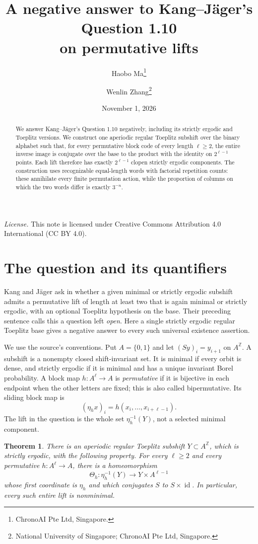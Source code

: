 \documentclass[11pt]{article}
\title{A negative answer to Kang--J\"ager's Question 1.10\protect\\ on permutative lifts}
\author{Haobo Ma\thanks{ChronoAI Pte Ltd, Singapore.}\and
Wenlin Zhang\thanks{National University of Singapore; ChronoAI Pte Ltd, Singapore.}}
\date{November 1, 2026}
\newtheorem{theorem}{Theorem}
\newcommand{\Z}{\mathbb Z}
\newcommand{\id}{\operatorname{id}}
\begin{document}
\maketitle
\begin{abstract}
We answer Kang--J\"ager's Question 1.10 \cite[Question 1.10]{KJ} negatively, including its strictly ergodic and Toeplitz versions.
We construct one aperiodic regular Toeplitz subshift over the binary alphabet such that, for every permutative block code of every length $\ell\geq2$, the entire inverse image is conjugate over the base to the product with the identity on $2^{\ell-1}$ points.
Each lift therefore has exactly $2^{\ell-1}$ clopen strictly ergodic components.
The construction uses recognizable equal-length words with factorial repetition counts: these annihilate every finite permutation action, while the proportion of columns on which the two words differ is exactly $3^{-n}$.
\end{abstract}
\noindent\textit{License.} This note is licensed under Creative Commons Attribution 4.0 International (CC BY 4.0).

\section{The question and its quantifiers}
Kang and J\"ager ask in \cite[Question 1.10]{KJ} whether a given minimal or strictly ergodic subshift admits a permutative lift of length at least two that is again minimal or strictly ergodic, with an optional Toeplitz hypothesis on the base. Their preceding sentence calls this a question left \emph{open}. Here a single strictly ergodic regular Toeplitz base gives a negative answer to every such universal existence assertion.

We use the source's conventions. Put $A=\{0,1\}$ and let $(Sy)_i=y_{i+1}$ on $A^{\Z}$. A subshift is a nonempty closed shift-invariant set. It is minimal if every orbit is dense, and strictly ergodic if it is minimal and has a unique invariant Borel probability. A block map $h:A^\ell\to A$ is \emph{permutative} if it is bijective in each endpoint when the other letters are fixed; this is also called bipermutative. Its sliding block map is
\[
 (\eta_hx)_i=h(x_i,\ldots,x_{i+\ell-1}).
\]
The lift in the question is the whole set $\eta_h^{-1}(Y)$, not a selected minimal component.

\begin{theorem}\label{thm:main}
There is an aperiodic regular Toeplitz subshift $Y\subset A^{\Z}$, which is strictly ergodic, with the following property. For every $\ell\geq2$ and every permutative $h:A^\ell\to A$, there is a homeomorphism
\[
 \Theta_h:\eta_h^{-1}(Y)\longrightarrow Y\times A^{\ell-1}
\]
whose first coordinate is $\eta_h$ and which conjugates $S$ to $S\times\id$. In particular, every such entire lift is nonminimal.
\end{theorem}
\end{document}
